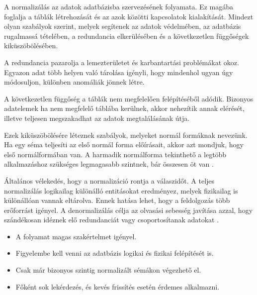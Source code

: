 
A normalizálás az adatok adatbázisba szervezésének folyamata. Ez magába foglalja a táblák létrehozását és az azok közötti kapcsolatok kialakítását. Mindezt olyan szabályok szerint, melyek segítenek az adatok védelmében, az adatbázis rugalmassá tételében, a redundancia elkerülésében és a következetlen függőségek kiküszöbölésében.

A redundancia pazarolja a lemezterületet és karbantartási problémákat okoz. Egyazon adat több helyen való tárolása igényli, hogy mindenhol ugyan úgy módosuljon, különben anomáliák jönnek létre.

A következetlen függőség a táblák nem megfelelően felépítéséből adódik. Bizonyos adatelemek ha nem megfelelő táblába kerülnek, akkor nehezítik annak elérését, illetve teljesen megszakadhat az adatok megtalálásának útja.

Ezek kiküszöbölésére léteznek szabályok, melyeket normál formáknak nevezünk. Ha egy séma teljesíti az első normál forma előírásait, akkor azt mondjuk, hogy első normálformában van. A harmadik normálforma tekinthető a legtöbb alkalmazáshoz szükséges legmagasabb szintnek, bár összesen öt van \cite{normaliz}.

Általános vélekedés, hogy a normalizáció rontja a válaszidőt. A teljes normalizálás logikailag különálló entitásokat eredményez, melyek fizikailag is különállóan vannak eltárolva. Ennek hatása lehet, hogy a feldolgozás több erőforrást igényel.
A denormalizálás célja az olvasási sebesség javítása azzal, hogy szándékosan idéznek elő redundanciát vagy csoportosítanak adatokat \cite{denormaliz}.
\begin{itemize}
\item A folyamat magas szakértelmet igényel.
\item Figyelembe kell venni az adatbázis logikai és fizikai felépítését is.
\item Csak már bizonyos szintig normalizált sémákon végezhető el.
\item Főként sok lekérdezés, és kevés frissítés esetén érdemes alkalmazni.
\end{itemize}



